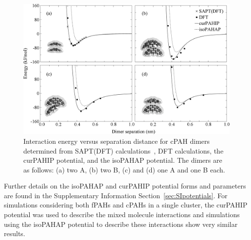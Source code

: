 \begin{figure}[!tbh]
\centering
\includegraphics[width=1\linewidth]{Figures/potentialDFT_curves.eps}
\caption{Interaction energy versus separation distance for cPAH dimers determined from SAPT(DFT) calculations~\cite{Cabaleiro-Lago2018}, DFT calculations, the curPAHIP potential, and the isoPAHAP potential. The dimers are as follows: (a) two A, (b) two B, (c) and (d) one A and one B each.}
\label{fig:potentialDFTcurves}
\end{figure}
%

Further details on the isoPAHAP and curPAHIP potential forms and parameters are found in the Supplementary Information Section~\ref{sec:SIpotentials}. For simulations considering both fPAHs and cPAHs in a single cluster, the curPAHIP potential was used to describe the mixed molecule interactions and simulations using the isoPAHAP potential to describe these interactions show very similar results.


